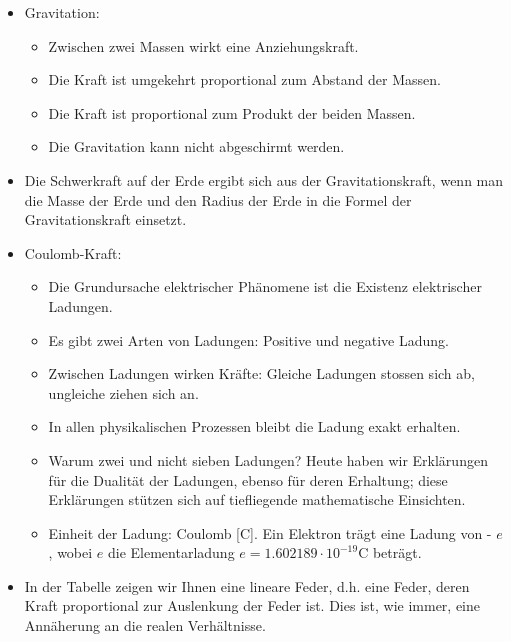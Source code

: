 \begin{itemize}
  \item Gravitation:
  \begin{itemize}
      \item Zwischen zwei Massen wirkt eine Anziehungskraft.
      \item Die Kraft ist umgekehrt proportional zum Abstand der Massen.
      \item Die Kraft ist proportional zum Produkt der beiden Massen.
      \item Die Gravitation kann nicht abgeschirmt werden.
  \end{itemize}
  \item Die Schwerkraft auf der Erde ergibt sich aus der Gravitationskraft, wenn man die Masse der Erde und den Radius der Erde in die Formel der Gravitationskraft einsetzt.
  \item Coulomb-Kraft:
  \begin{itemize}
      \item Die Grundursache elektrischer Phänomene ist die Existenz elektrischer Ladungen.
      \item Es gibt zwei Arten von Ladungen: Positive und negative Ladung.
      \item Zwischen Ladungen wirken Kräfte: Gleiche Ladungen stossen sich ab, ungleiche ziehen sich an.
      \item In allen physikalischen Prozessen bleibt die Ladung exakt erhalten.
      \item Warum zwei und nicht sieben Ladungen? Heute haben wir Erklärungen für die Dualität der Ladungen, ebenso für deren Erhaltung; diese Erklärungen stützen sich auf tiefliegende mathematische Einsichten.
      \item Einheit der Ladung: Coulomb [C]. Ein Elektron trägt eine Ladung von - $e$, wobei $e$ die Elementarladung $e=1.602189 \cdot 10^{-19} \mathrm{C}$ beträgt.
  \end{itemize}
  \item In der Tabelle zeigen wir Ihnen eine lineare Feder, d.h. eine Feder, deren Kraft proportional zur Auslenkung der Feder ist. Dies ist, wie immer, eine Annäherung an die realen Verhältnisse.
\end{itemize}
